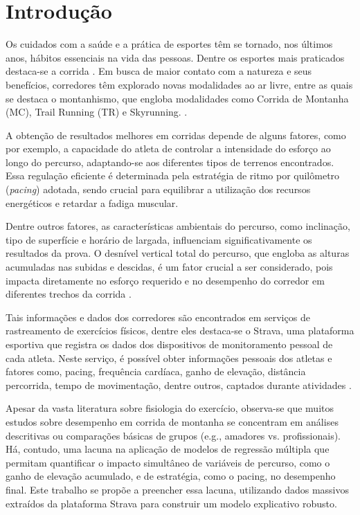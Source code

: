 
\chapter{Introdução}
Os cuidados com a saúde e a prática de esportes têm se tornado, nos últimos anos, hábitos essenciais na vida das pessoas. Dentre os esportes mais praticados destaca-se a corrida \citet{strava_pesquisa}. Em busca de maior contato com a natureza e seus benefícios, corredores têm explorado novas modalidades ao ar livre, entre as quais se destaca o montanhismo, que engloba modalidades como Corrida de Montanha (MC), Trail Running (TR) e Skyrunning. \citet{francagl}.

A obtenção de resultados melhores em corridas depende de alguns fatores, como por exemplo, a capacidade do atleta de controlar a intensidade do esforço ao longo do percurso, adaptando-se aos diferentes tipos de terrenos encontrados. Essa regulação eficiente é determinada pela estratégia de ritmo por quilômetro (\textit{pacing}) adotada, sendo crucial para equilibrar a utilização dos recursos energéticos e retardar a fadiga muscular.  \citet{borgesdl}

Dentre outros fatores, as características ambientais do percurso, como inclinação, tipo de superfície e horário de largada, influenciam significativamente os resultados da prova. O desnível vertical total do percurso, que engloba as alturas acumuladas nas subidas e descidas, é um fator crucial a ser considerado, pois impacta diretamente no esforço requerido e no desempenho do corredor em diferentes trechos da corrida \citet{borgesdl}.

Tais informações e dados dos corredores são encontrados em serviços de rastreamento de exercícios físicos, dentre eles destaca-se o Strava, uma plataforma esportiva que registra os dados dos dispositivos de monitoramento pessoal de cada atleta. Neste serviço, é possível obter informações pessoais dos atletas e fatores como, pacing, frequência cardíaca, ganho de elevação, distância percorrida, tempo de movimentação, dentre outros, captados durante atividades \citet{strava_info}. 

Apesar da vasta literatura sobre fisiologia do exercício, observa-se que muitos estudos sobre desempenho em corrida de montanha se concentram em análises descritivas ou comparações básicas de grupos (e.g., amadores vs. profissionais). Há, contudo, uma lacuna na aplicação de modelos de regressão múltipla que permitam quantificar o impacto simultâneo de variáveis de percurso, como o ganho de elevação acumulado, e de estratégia, como o pacing, no desempenho final. Este trabalho se propõe a preencher essa lacuna, utilizando dados massivos extraídos da plataforma Strava para construir um modelo explicativo robusto.

